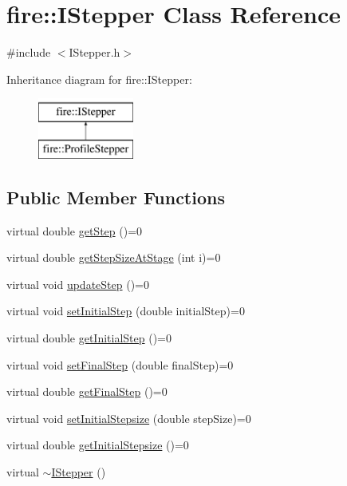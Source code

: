 \hypertarget{a00026}{}\section{fire\+:\+:I\+Stepper Class Reference}
\label{a00026}


{\ttfamily \#include $<$I\+Stepper.\+h$>$}

Inheritance diagram for fire\+:\+:I\+Stepper\+:\begin{figure}[H]
\begin{center}
\leavevmode
\includegraphics[height=2.000000cm]{a00026}
\end{center}
\end{figure}
\subsection*{Public Member Functions}
\begin{DoxyCompactItemize}
\item 
virtual double \hyperlink{a00026_a7f709d1462a2a3b8bd8214cc681ca26e}{get\+Step} ()=0
\item 
virtual double \hyperlink{a00026_a43027c0c268afcd59db8815c2e2c41ea}{get\+Step\+Size\+At\+Stage} (int i)=0
\item 
virtual void \hyperlink{a00026_a44dfccb90ee5ef6e080b54113c215458}{update\+Step} ()=0
\item 
virtual void \hyperlink{a00026_a3a5099cd0f3c874e56c33cb8f13b8f3b}{set\+Initial\+Step} (double initial\+Step)=0
\item 
virtual double \hyperlink{a00026_a49df3a2ac05cebaf2baf387b66d19272}{get\+Initial\+Step} ()=0
\item 
virtual void \hyperlink{a00026_add76974a7b6fbbc93916270a376c461e}{set\+Final\+Step} (double final\+Step)=0
\item 
virtual double \hyperlink{a00026_ab234d9f032e02668aededf1c22e8c0a9}{get\+Final\+Step} ()=0
\item 
virtual void \hyperlink{a00026_a69c262f248511efcd271be1724a41ad9}{set\+Initial\+Stepsize} (double step\+Size)=0
\item 
virtual double \hyperlink{a00026_afb777e62386b25e5a38d59af54972690}{get\+Initial\+Stepsize} ()=0
\item 
virtual \hyperlink{a00026_ac8ec460d35512e2e039396d5192eb57e}{$\sim$\+I\+Stepper} ()
\end{DoxyCompactItemize}



